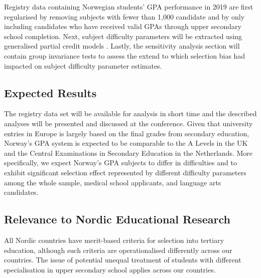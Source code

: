 Registry data containing Norwegian students' GPA performance in 2019 are first regularised by removing subjects with fewer than 1,000 candidate \textcite[as per advice by][]{he:2018} and by only including candidates who have received valid GPAs through upper secondary school completion. Next, subject difficulty parameters will be extracted using generalised partial credit models \parencite[GPCM,][]{muraki:1992}. Lastly, the sensitivity analysis section will contain group invariance tests to assess the extend to which selection bias had impacted on subject difficulty parameter estimates.

\subsection{Expected Results}

The registry data set will be available for analysis in short time and the described analyses will be presented and discussed at the conference. Given that university entries in Europe is largely based on the final grades from secondary education, Norway's GPA system is expected to be comparable to the A Levels in the UK and the Central Examinations in Secondary Education in the Netherlands. More specifically, we expect Norway's GPA subjects to differ in difficulties \parencite[per report by][]{he:2018} and to exhibit significant selection effect \parencite[as demonstrated in][]{korobko:2008} represented by different difficulty parameters among the whole sample, medical school applicants, and language arts candidates.

\subsection{Relevance to Nordic Educational Research}

All Nordic countries have merit-based criteria for selection into tertiary education, although such criteria are operationalised differently across our countries. The issue of potential unequal treatment of students with different specialisation in upper secondary school applies across our countries.

\printbibliography